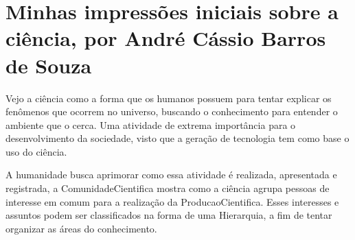 \section{Minhas impressões iniciais sobre a ciência, por André Cássio Barros de Souza}

Vejo a ciência como a forma que os humanos possuem para tentar explicar os fenômenos que ocorrem no universo, buscando o conhecimento para entender o ambiente que o cerca. Uma atividade de extrema importância para o desenvolvimento da sociedade, visto que a geração de \gls{tecnologia} tem como base o uso do ciência.

A humanidade busca aprimorar como essa atividade é realizada, apresentada e registrada, a \gls{ComunidadeCientifica} mostra como a ciência agrupa pessoas de interesse em comum para a realização da \gls{ProducaoCientifica}. Esses interesses e assuntos podem ser classificados na forma de uma \gls{Hierarquia}, a fim de tentar organizar as áreas do conhecimento.

